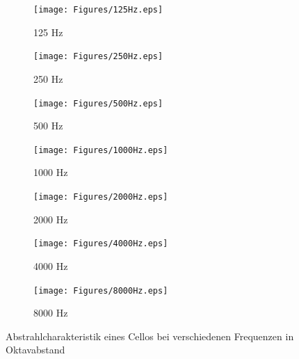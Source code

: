 \begin{figure}[H]
    \centering
    \begin{subfigure}{.5\textwidth}
        \centering
        \caption{125 Hz}
        \texttt{[image: Figures/125Hz.eps]}
    \end{subfigure}%
    \begin{subfigure}{.5\textwidth}
        \centering
        \caption{250 Hz}
        \texttt{[image: Figures/250Hz.eps]}
    \end{subfigure}

    \vspace{0.5cm}
    \begin{subfigure}{.5\textwidth}
        \centering
        \caption{500 Hz}
        \texttt{[image: Figures/500Hz.eps]}
    \end{subfigure}%
    \begin{subfigure}{.5\textwidth}
        \centering
        \caption{1000 Hz}
        \texttt{[image: Figures/1000Hz.eps]}
    \end{subfigure}

    \vspace{0.5cm}
    \begin{subfigure}{.5\textwidth}
        \centering
        \caption{2000 Hz}
        \texttt{[image: Figures/2000Hz.eps]}
    \end{subfigure}%
    \begin{subfigure}{.5\textwidth}
        \centering
        \caption{4000 Hz}
        \texttt{[image: Figures/4000Hz.eps]}
    \end{subfigure}

    \vspace{0.5cm}
    \begin{subfigure}{.5\textwidth}
        \centering
        \caption{8000 Hz}
        \texttt{[image: Figures/8000Hz.eps]}
    \end{subfigure}

    \caption{Abstrahlcharakteristik eines Cellos bei verschiedenen Frequenzen in Oktavabstand}
    \label{fig:balloon}
\end{figure}


